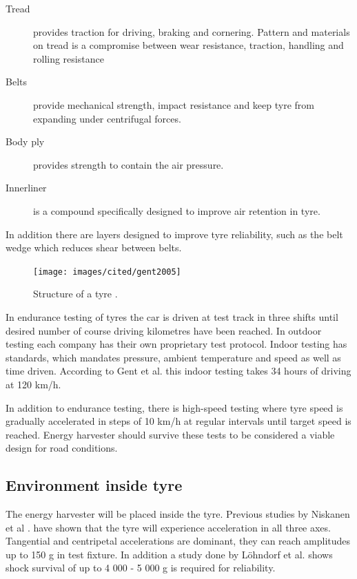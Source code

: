 \begin{description}
  \item[Tread] provides traction for driving, braking and cornering. Pattern and materials on
tread is a compromise between wear resistance, traction, handling and rolling
resistance
  \item[Belts] provide mechanical strength, impact resistance and keep tyre from expanding
under centrifugal forces.
  \item[Body ply] provides strength to contain the air pressure.
  \item[Innerliner] is a compound specifically designed to improve air retention in tyre.
\end{description}
In addition there are layers designed to improve tyre reliability, such as the belt
wedge which reduces shear between belts.


\begin{figure}[h]
\begin{center}
\texttt{[image: images/cited/gent2005]}
\end{center}
\caption{Structure of a tyre \cite{Gent2005}.}
\label{fig:tyre_structure_diagram}
\end{figure}


In endurance testing of tyres the car is driven at test track in three shifts until
desired number of course driving kilometres have been reached. In outdoor testing
each company has their own proprietary test protocol. Indoor testing has standards,
which mandates pressure, ambient temperature and speed as well as time driven.
According to Gent et al. \cite{Gent2005} this indoor testing takes 34 hours of driving at 120
km/h.

In addition to endurance testing, there is high-speed testing where tyre speed is
gradually accelerated in steps of 10 km/h at regular intervals until target speed is
reached. Energy harvester should survive these tests to be considered a viable design for road conditions.


\subsection{Environment inside tyre}
The energy harvester will be placed inside the tyre. Previous studies by Niskanen et al \cite{Niskanen2014}. have shown that the tyre will experience acceleration in all three axes. Tangential and centripetal accelerations are dominant, they can reach amplitudes up to 150 g in test fixture. In addition a study done by Löhndorf et al. \cite{Lohndorf2007} shows shock survival of up to 4 000 - 5 000 g is required for reliability. 

